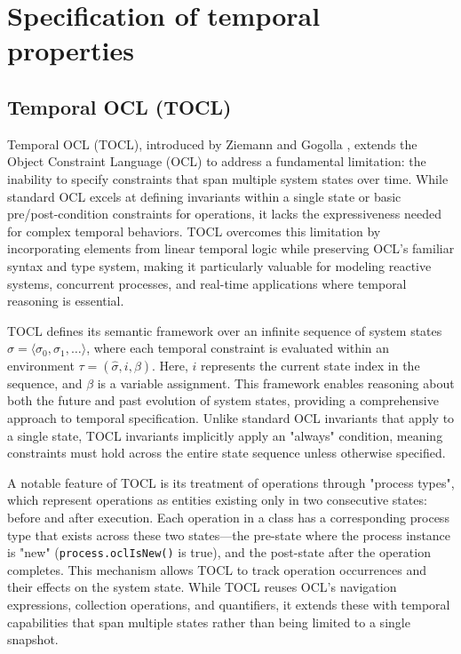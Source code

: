 \section{Specification of temporal properties}

\subsection{Temporal OCL (TOCL)}

\hspace{1cm} Temporal OCL (TOCL), introduced by Ziemann and Gogolla \cite{TOCL}, 
extends the Object Constraint Language (OCL) to address a fundamental limitation: 
the inability to specify constraints that span multiple system states over time. 
While standard OCL excels at defining invariants within a single state or basic 
pre/post-condition constraints for operations, it lacks the expressiveness needed 
for complex temporal behaviors. TOCL overcomes this limitation by incorporating 
elements from linear temporal logic while preserving OCL's familiar syntax and type 
system, making it particularly valuable for modeling reactive systems, concurrent 
processes, and real-time applications where temporal reasoning is essential.

TOCL defines its semantic framework over an infinite sequence of system states 
$\hat{\sigma} = \langle \sigma_0, \sigma_1, \ldots \rangle$, where each temporal 
constraint is evaluated within an environment $\tau = (\hat{\sigma}, i, \beta)$. 
Here, $i$ represents the current state index in the sequence, and $\beta$ is a 
variable assignment. This framework enables reasoning about both the future and 
past evolution of system states, providing a comprehensive approach to temporal 
specification. Unlike standard OCL invariants that apply to a single state, TOCL 
invariants implicitly apply an "always" condition, meaning constraints must hold 
across the entire state sequence unless otherwise specified.

A notable feature of TOCL is its treatment of operations through "process types", 
which represent operations as entities existing only in two consecutive states: 
before and after execution. Each operation in a class has a corresponding process 
type that exists across these two states—the pre-state where the process instance is 
"new" (\texttt{process.oclIsNew()} is true), and the post-state after the operation 
completes. This mechanism allows TOCL to track operation occurrences and their 
effects on the system state. While TOCL reuses OCL's navigation 
expressions, collection operations, and quantifiers, it extends these with temporal 
capabilities that span multiple states rather than being limited to a single snapshot.

